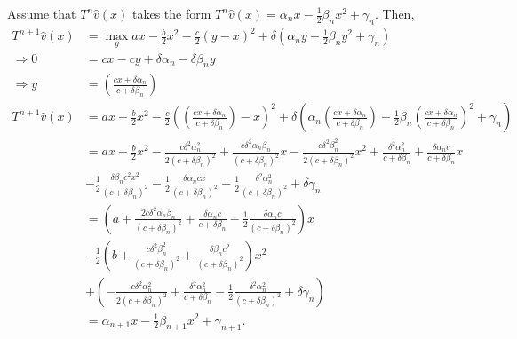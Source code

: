 \documentclass[11pt]{article} %
\begin{document}
Assume that $T^n\hat{v}(x)$ takes the form $T^n\hat{v}(x) = \alpha_n x - \frac{1}{2}\beta_n x^2 + \gamma_n.$ Then,
\begin{align*}
T^{n+1}\hat{v} (x) &= \max_y ax - \frac{b}{2}x^2 - \frac{c}{2}(y-x)^2 + \delta (\alpha_n y - \frac{1}{2}\beta_n y^2 + \gamma_n)\\
\Rightarrow 0 &= cx - cy + \delta \alpha_n - \delta \beta_n y \\
\Rightarrow y &= \left(\frac{cx + \delta \alpha_n}{c+\delta \beta_n}\right)\\
T^{n+1}\hat{v} (x) &= ax - \frac{b}{2}x^2 - \frac{c}{2}\left( \left(\frac{cx + \delta \alpha_n}{c+\delta \beta_n}\right)-x\right)^2 + \delta \left(\alpha_n  \left(\frac{cx + \delta \alpha_n}{c+\delta \beta_n}\right) - \frac{1}{2}\beta_n  \left(\frac{cx + \delta \alpha_n}{c+\delta \beta_n}\right)^2 + \gamma_n\right)\\
&=  ax - \frac{b}{2}x^2 - \frac{c \delta^2 \alpha_n^2}{2(c+\delta \beta_n)^2} +\frac{c\delta^2\alpha_n \beta_n}{(c+\delta \beta_n)^2}x - \frac{c \delta^2 \beta_n^2}{2(c+\delta \beta_n)^2}x^2  + \frac{\delta^2 \alpha_n^2}{c+\delta \beta_n} + \frac{ \delta \alpha_n c }{c+\delta \beta_n}x \\ &- \frac{1}{2}\frac{\delta \beta_n c^2x^2}{(c+\delta \beta_n)^2} -  \frac{1}{2}\frac{\delta \alpha_n c x}{(c+\delta \beta_n)^2} - \frac{1}{2}\frac{\delta^2 \alpha_n^2}{(c+\delta \beta_n)^2}+ \delta \gamma_n \\
&= \left( a + \frac{2c\delta^2\alpha_n \beta_n}{(c+\delta \beta_n)^2}  + \frac{ \delta \alpha_n c }{c+\delta \beta_n}  -  \frac{1}{2}\frac{\delta \alpha_n c}{(c+\delta \beta_n)^2}\right) x \\
&- \frac{1}{2}\left( b +  \frac{c \delta^2 \beta_n^2}{(c+\delta \beta_n)^2} + \frac{\delta \beta_n c^2}{(c+\delta \beta_n)^2} \right) x^2 \\
&+\left( - \frac{c \delta^2 \alpha_n^2}{2(c+\delta \beta_n)^2} + \frac{\delta^2 \alpha_n^2}{c+\delta \beta_n} - \frac{1}{2}\frac{\delta^2 \alpha_n^2}{(c+\delta \beta_n)^2}+ \delta\gamma_n\right)\\
&=\alpha_{n+1} x -\frac{1}{2}\beta_{n+1}x^2 + \gamma_{n+1}.
\end{align*}
\end{document}

